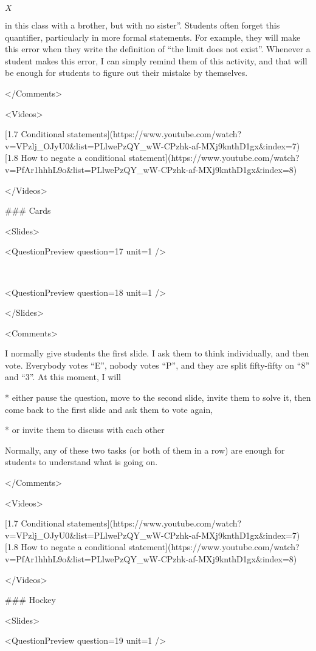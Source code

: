 $X$

in this class with a brother, but with no sister”. Students often forget this quantifier, particularly in more formal statements. For example, they will make this error when they write the definition of “the limit does not exist”. Whenever a student makes this error, I can simply remind them of this activity, and that will be enough for students to figure out their mistake by themselves.

</Comments>

<Videos>

[1.7 Conditional statements](https://www.youtube.com/watch?v=VPzlj_OJyU0\&list=PLlwePzQY_wW-CPzhk-af-MXj9knthD1gx\&index=7)[1.8 How to negate a conditional statement](https://www.youtube.com/watch?v=PfAr1hhhL9o\&list=PLlwePzQY_wW-CPzhk-af-MXj9knthD1gx\&index=8)

</Videos>

### Cards

<Slides>

<QuestionPreview question={17} unit={1} />

 

<QuestionPreview question={18} unit={1} />

</Slides>

<Comments>

I normally give students the first slide. I ask them to think individually, and then vote. Everybody votes “E”, nobody votes “P”, and they are split fifty-fifty on “8” and “3”. At this moment, I will

*   either pause the question, move to the second slide, invite them to solve it, then come back to the first slide and ask them to vote again,

*   or invite them to discuss with each other

Normally, any of these two tasks (or both of them in a row) are enough for students to understand what is going on.

</Comments>

<Videos>

[1.7 Conditional statements](https://www.youtube.com/watch?v=VPzlj_OJyU0\&list=PLlwePzQY_wW-CPzhk-af-MXj9knthD1gx\&index=7)[1.8 How to negate a conditional statement](https://www.youtube.com/watch?v=PfAr1hhhL9o\&list=PLlwePzQY_wW-CPzhk-af-MXj9knthD1gx\&index=8)

</Videos>

### Hockey

<Slides>

<QuestionPreview question={19} unit={1} />

